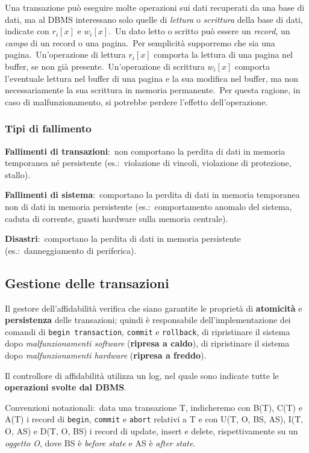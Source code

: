 Una transazione può eseguire molte operazioni sui dati recuperati da una base di dati, ma al DBMS interessano solo quelle di \textit{lettura} o \textit{scrittura} della base di dati, indicate con $r_i[x]$ e $w_i[x]$.\
Un dato letto o scritto può essere un \textit{record}, un \textit{campo} di un record o una pagina.\
Per semplicità supporremo che sia una pagina.\
Un'operazione di lettura $r_i[x]$ comporta la lettura di una pagina nel buffer, se non già presente.\
Un'operazione di scrittura $w_i[x]$ comporta l'eventuale lettura nel buffer di una pagina e la sua modifica nel buffer, ma non necessariamente la sua scrittura in memoria permanente.\
Per questa ragione, in caso di malfunzionamento, si potrebbe perdere l'effetto dell'operazione.\

\subsubsection{Tipi di fallimento}

\textbf{Fallimenti di transazioni}:\ non comportano la perdita di dati in memoria temporanea né persistente (es.:\ violazione di vincoli, violazione di protezione, stallo).\

\noindent\textbf{Fallimenti di sistema}:\ comportano la perdita di dati in memoria temporanea non di dati in memoria persistente (es.:\ comportamento anomalo del sistema, caduta di corrente, guasti hardware sulla memoria centrale).

\noindent\textbf{Disastri}:\ comportano la perdita di dati in memoria persistente (es.:\ danneggiamento di periferica).

\subsection{Gestione delle transazioni}
Il gestore dell'affidabilità verifica che siano garantite le proprietà di \textbf{atomicità} e \textbf{persistenza} delle transazioni; quindi è responsabile dell'implementazione dei comandi di \texttt{begin transaction}, \texttt{commit} e \texttt{rollback}, di ripristinare il sistema dopo \textit{malfunzionamenti software} (\textbf{ripresa a caldo}), di ripristinare il sistema dopo \textit{malfunzionamenti hardware} (\textbf{ripresa a freddo}).

Il controllore di affidabilità utilizza un log, nel quale sono indicate tutte le \textbf{operazioni svolte dal DBMS}.\

\vspace{12pt}
\noindent Convenzioni notazionali:\ data una transazione T, indicheremo con B(T), C(T) e A(T) i record di \texttt{begin}, \texttt{commit} e \texttt{abort} relativi a T e con U(T, O, BS, AS), I(T, O, AS) e D(T, O, BS) i record di update, insert e delete, rispettivamente su un \textit{oggetto O}, dove BS è \textit{before state} e AS è \textit{after state}.\
\vspace{12pt}

